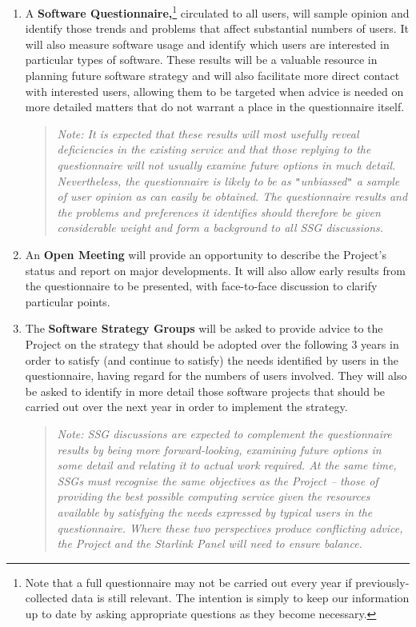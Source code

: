 \documentclass[11pt]{article}
\newcommand{\st}[1]{{\em{#1}}}
\newcommand{\qt}[1]{``#1''}
\renewcommand{\qt}[1]{{\tt{"}}#1{\tt{"}}}
\begin{document}
\begin{enumerate}
\item A {\bf Software Questionnaire,}\footnote{Note that a full
questionnaire may not be carried out every year if
previously-collected data is still relevant. The intention is simply
to keep our information up to date by asking appropriate questions as
they become necessary.}  circulated to all users, will sample opinion
and identify those trends and problems that affect substantial numbers
of users.  It will also measure software usage and identify which
users are interested in particular types of software. These results
will be a valuable resource in planning future software strategy and
will also facilitate more direct contact with interested users,
allowing them to be targeted when advice is needed on more detailed
matters that do not warrant a place in the questionnaire itself.

\begin{quote}
\st{Note: It is expected that these results will most usefully reveal
deficiencies in the existing service and that those replying to the
questionnaire will not usually examine future options in much
detail. Nevertheless, the questionnaire is likely to be as
\qt{unbiassed} a sample of user opinion as can easily be obtained. The
questionnaire results and the problems and preferences it identifies
should therefore be given considerable weight and form a background to
all SSG discussions.}
\end{quote}

\item An {\bf Open Meeting} will provide an opportunity to
describe the Project's status and report on major developments. It
will also allow early results from the questionnaire to be presented,
with face-to-face discussion to clarify particular points.

\item The {\bf Software Strategy Groups} will be asked to provide
advice to the Project on the strategy that should be adopted over the
following 3 years in order to satisfy (and continue to satisfy) the
needs identified by users in the questionnaire, having regard for the
numbers of users involved. They will also be asked to identify in more
detail those software projects that should be carried out over the
next year in order to implement the strategy.

\begin{quote}
\st{Note: SSG discussions are expected to complement the questionnaire
results by being more forward-looking, examining future options in
some detail and relating it to actual work required. At the same time,
SSGs must recognise the same objectives as the Project -- those of
providing the best possible computing service given the resources
available by satisfying the needs expressed by typical users in the
questionnaire. Where these two perspectives produce conflicting
advice, the Project and the Starlink Panel will need to ensure
balance.}
\end{quote}


\end{enumerate}
\end{document}
